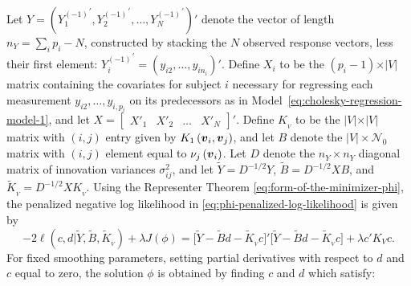 \documentclass[12pt]{article}
\newcommand{\bfv}{\mbox{\boldmath $v$}}
\newcommand{\tildeY}{\tilde{Y}}
\newcommand{\tildeK}{\tilde{K}}
\newcommand{\tildeB}{\tilde{B}}
\begin{document}
Let $Y = \left({Y_1^{\scriptscriptstyle \left(-1\right)}}^\prime, {Y_2^{\scriptscriptstyle \left(-1\right)}}^\prime, \dots,{Y_N^{\scriptscriptstyle \left(-1\right)}}^\prime\right)'$ denote the vector of length $n_Y= \sum_{i} p_i - N$, constructed by stacking the $N$ observed response vectors, less their first element: ${Y_i^{\scriptscriptstyle \left(-1\right)}}^\prime = \left( y_{i2}, \dots, y_{in_i} \right)'$.
Define $X_i$ to be the $\left(p_i-1\right) \times \vert V \vert$ matrix containing the covariates for subject $i$ necessary for regressing each measurement $y_{i2}, \dots, y_{i,p_i}$ on its predecessors as in Model~\eqref{eq:cholesky-regression-model-1}, and let $X = \begin{bmatrix}X'_1 & X'_2 & \dots & X'_N  \end{bmatrix}'$. Define $K_{_{ V}}$ to be the $\vert V \vert \times \vert V \vert$ matrix with $\left(i,j\right)$ entry given by $K_1\left(\bfv_i, \bfv_j\right)$, and let $B$ denote the $\vert V \vert \times \mathcal{N}_0$ matrix with $\left(i,j\right)$ element equal to $\nu_j\left(\bfv_i\right)$. Let $D$ denote the $n_Y \times n_Y$ diagonal matrix of  innovation variances $\sigma^2_{ij}$, and let $\tildeY = D^{-1/2} Y$, $\tildeB = D^{-1/2} X B $, and $\tildeK_{_{ V}} = D^{-1/2} X K_{_{ V}}$. Using the Representer Theorem \eqref{eq:form-of-the-minimizer-phi}, the penalized negative log likelihood in \eqref{eq:phi-penalized-log-likelihood} is given by
\begin{equation}\label{eq:penalized-loglik-tilde-vectorized}
-2\ell \left(c, d \vert \tildeY, \tildeB, \tildeK_{_{ V}} \right) + \lambda J\left( \phi \right) = \bigg[ \tildeY - \tildeB d - \tildeK_{_{ V}} c\bigg]'\bigg[ \tildeY - \tildeB d - \tildeK_{_{ V}} c\bigg] + \lambda c'K_Vc.
\end{equation}
\noindent
For fixed smoothing parameters, setting partial derivatives with respect to $d$ and $c$ equal to zero, the solution $\phi$ is obtained by finding $c$ and $d$ which satisfy: 
\end{document}
